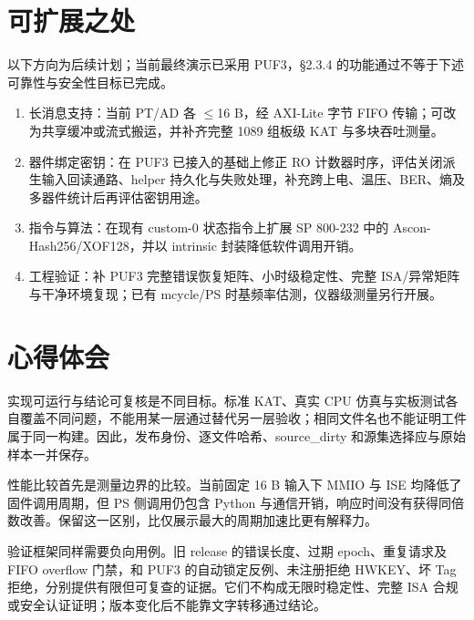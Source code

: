
\Needspace{85pt}

\section{可扩展之处}

以下方向为后续计划；当前最终演示已采用 PUF3，§2.3.4 的功能通过不等于下述可靠性与安全性目标已完成。

\begin{enumerate}
\def\labelenumi{\arabic{enumi}.}
\tightlist
\item
  长消息支持：当前 PT/AD 各 $\leq$16 B，经 AXI-Lite 字节 FIFO 传输；可改为共享缓冲或流式搬运，并补齐完整 1089 组板级 KAT 与多块吞吐测量。
\item
  器件绑定密钥：在 PUF3 已接入的基础上修正 RO 计数器时序，评估关闭派生输入回读通路、helper 持久化与失败处理，补充跨上电、温压、BER、熵及多器件统计后再评估密钥用途。
\item
  指令与算法：在现有 custom-0 状态指令上扩展 SP 800-232 中的 Ascon-Hash256/XOF128，并以 intrinsic 封装降低软件调用开销。
\item
  工程验证：补 PUF3 完整错误恢复矩阵、小时级稳定性、完整 ISA/异常矩阵与干净环境复现；已有 mcycle/PS 时基频率估测，仪器级测量另行开展。
\end{enumerate}

\Needspace{85pt}

\section{心得体会}

实现可运行与结论可复核是不同目标。标准 KAT、真实 CPU 仿真与实板测试各自覆盖不同问题，不能用某一层通过替代另一层验收；相同文件名也不能证明工件属于同一构建。因此，发布身份、逐文件哈希、source\_dirty 和源集选择应与原始样本一并保存。

性能比较首先是测量边界的比较。当前固定 16 B 输入下 MMIO 与 ISE 均降低了固件调用周期，但 PS 侧调用仍包含 Python 与通信开销，响应时间没有获得同倍数改善。保留这一区别，比仅展示最大的周期加速比更有解释力。

验证框架同样需要负向用例。旧 release 的错误长度、过期 epoch、重复请求及 FIFO overflow 门禁，和 PUF3 的自动锁定反例、未注册拒绝 HWKEY、坏 Tag 拒绝，分别提供有限但可复查的证据。它们不构成无限时稳定性、完整 ISA 合规或安全认证证明；版本变化后不能靠文字转移通过结论。
